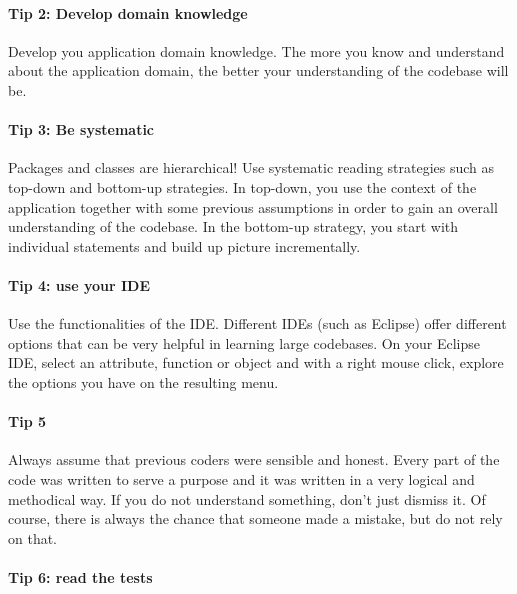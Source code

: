 \documentclass[
]{book}
\begin{document}
\hypertarget{tip-2-develop-domain-knowledge}{%
\paragraph{Tip 2: Develop domain knowledge}\label{tip-2-develop-domain-knowledge}}

Develop you application domain knowledge. The more you know and understand about the application domain, the better your understanding of the codebase will be.

\hypertarget{tip-3-be-systematic}{%
\paragraph{Tip 3: Be systematic}\label{tip-3-be-systematic}}

Packages and classes are hierarchical! Use systematic reading strategies such as top-down and bottom-up strategies. In top-down, you use the context of the application together with some previous assumptions in order to gain an overall understanding of the codebase. In the bottom-up strategy, you start with individual statements and build up picture incrementally.

\hypertarget{tip-4-use-your-ide}{%
\paragraph{Tip 4: use your IDE}\label{tip-4-use-your-ide}}

Use the functionalities of the IDE. Different IDEs (such as Eclipse) offer different options that can be very helpful in learning large codebases. On your Eclipse IDE, select an attribute, function or object and with a right mouse click, explore the options you have on the resulting menu.

\hypertarget{tip-5}{%
\paragraph{Tip 5}\label{tip-5}}

Always assume that previous coders were sensible and honest. Every part of the code was written to serve a purpose and it was written in a very logical and methodical way. If you do not understand something, don't just dismiss it. Of course, there is always the chance that someone made a mistake, but do not rely on that.

\hypertarget{tip-6-read-the-tests}{%
\paragraph{Tip 6: read the tests}\label{tip-6-read-the-tests}}
\end{document}
